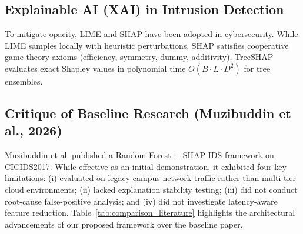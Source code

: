 \documentclass[conference]{IEEEtran}
\begin{document}
\subsection{Explainable AI (XAI) in Intrusion Detection}
To mitigate opacity, LIME and SHAP have been adopted in cybersecurity\cite{wang2025feature}. While LIME samples locally with heuristic perturbations, SHAP satisfies cooperative game theory axioms (efficiency, symmetry, dummy, additivity)\cite{lundberg2017unified}. TreeSHAP evaluates exact Shapley values in polynomial time $O(B \cdot L \cdot D^2)$ for tree ensembles.

\subsection{Critique of Baseline Research (Muzibuddin et al., 2026)}
Muzibuddin et al.\cite{muzibuddin2026explainable} published a Random Forest + SHAP IDS framework on CICIDS2017. While effective as an initial demonstration, it exhibited four key limitations: (i) evaluated on legacy campus network traffic rather than multi-tier cloud environments; (ii) lacked explanation stability testing; (iii) did not conduct root-cause false-positive analysis; and (iv) did not investigate latency-aware feature reduction. Table~\ref{tab:comparison_literature} highlights the architectural advancements of our proposed framework over the baseline paper.
\end{document}
